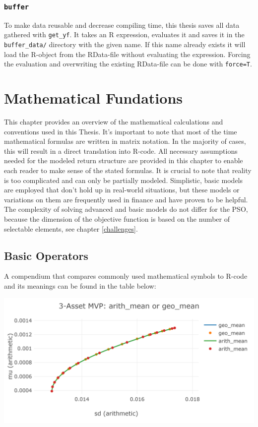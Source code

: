 \documentclass[
  oneside]{book}
\begin{document}
\hypertarget{buffer}{%
\subsection{\texorpdfstring{\texttt{buffer}}{buffer}}\label{buffer}}

To make data reusable and decrease compiling time, this thesis saves all data gathered with \texttt{get\_yf}. It takes an R expression, evaluates it and saves it in the \texttt{buffer\_data/} directory with the given name. If this name already exists it will load the R-object from the RData-file without evaluating the expression. Forcing the evaluation and overwriting the existing RData-file can be done with \texttt{force=T}.

\hypertarget{mathematical-fundations}{%
\chapter{Mathematical Fundations}\label{mathematical-fundations}}

This chapter provides an overview of the mathematical calculations and conventions used in this Thesis. It's important to note that most of the time mathematical formulas are written in matrix notation. In the majority of cases, this will result in a direct translation into R-code. All necessary assumptions needed for the modeled return structure are provided in this chapter to enable each reader to make sense of the stated formulas. It is crucial to note that reality is too complicated and can only be partially modeled. Simplistic, basic models are employed that don't hold up in real-world situations, but these models or variations on them are frequently used in finance and have proven to be helpful. The complexity of solving advanced and basic models do not differ for the PSO, because the dimension of the objective function is based on the number of selectable elements, see chapter \ref{challenges}.

\hypertarget{basic-operators}{%
\section{Basic Operators}\label{basic-operators}}

A compendium that compares commonly used mathematical symbols to R-code and its meanings can be found in the table below:

\includegraphics{Master_Thesis_files/figure-latex/unnamed-chunk-4-1.png}
\end{document}
